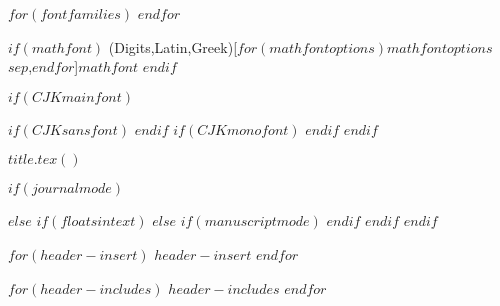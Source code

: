 $for(fontfamilies)$
  \setmonofont[$for(monofontoptions)$$monofontoptions$$sep$,$endfor$$if(monofontfallback)$,RawFeature={fallback=monofontfallback}$endif$]{$monofont$}
$endfor$

$if(mathfont)$
\setmathfont(Digits,Latin,Greek)[$for(mathfontoptions)$$mathfontoptions$$sep$,$endfor$]{$mathfont$}
$endif$

$if(CJKmainfont)$
    \usepackage{xeCJK}
    $if(CJKsansfont)$
    $endif$
    $if(CJKmonofont)$
    $endif$
$endif$

$title.tex()$

$if(journalmode)$
\usepackage{pbalance} 
\usepackage{float}
\makeatletter
\let\oldtpt\ThreePartTable
\let\endoldtpt\endThreePartTable
\def\ThreePartTable{\@ifnextchar[\ThreePartTable@i \ThreePartTable@ii}
\def\ThreePartTable@i[#1]{\begin{figure}[!htbp]
\onecolumn
\begin{minipage}{0.5\textwidth}
\oldtpt[#1]
}
\def\ThreePartTable@ii{\begin{figure}[!htbp]
\onecolumn
\begin{minipage}{0.5\textwidth}
\oldtpt
}
\def\endThreePartTable{
\endoldtpt
\end{minipage}
\twocolumn
\end{figure}}
\makeatother


\makeatletter
\let\endoldlt\endlongtable		
\def\endlongtable{
\hline
\endoldlt}
\makeatother

\newenvironment{twocolumntable}%
{%
\begin{table*}[!htbp]%
\onecolumn%
}%
{%
\twocolumn%
\end{table*}%
}%
$else$
\makeatletter
\let\endoldlt\endlongtable
\def\endlongtable{
\hline
\endoldlt
}
\makeatother
$if(floatsintext)$
$else$
$if(manuscriptmode)$
\RequirePackage{longtable}
$endif$
$endif$
$endif$



$for(header-insert)$
$header-insert$
$endfor$

$for(header-includes)$
$header-includes$
$endfor$

\makeatletter
\xpatchcmd{\appendix}
  {\par}
  {\par}
  {}{}
\makeatother




